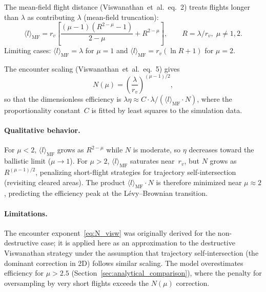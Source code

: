 The mean-field flight distance
(Viswanathan~et~al.\ eq.~2) treats flights longer than
$\lambda$ as contributing $\lambda$ (mean-field truncation):
\begin{equation}
  \langle l \rangle_{\mathrm{MF}} = r_v \left[
    \frac{(\mu-1)(R^{2-\mu}-1)}{2-\mu} + R^{2-\mu}
  \right], \qquad R = \lambda/r_v,\; \mu \neq 1,2.
  \label{eq:mean_l_mf}
\end{equation}
Limiting cases: $\langle l \rangle_{\mathrm{MF}} = \lambda$
for $\mu = 1$ and
$\langle l \rangle_{\mathrm{MF}} =
r_v(\ln R + 1)$ for $\mu = 2$.

The encounter scaling
(Viswanathan~et~al.\ eq.~5) gives
\begin{equation}
  N(\mu) = \left(\frac{\lambda}{r_v}\right)^{(\mu-1)/2},
  \label{eq:N_visw}
\end{equation}
so that the dimensionless efficiency is
$\lambda\eta \approx C \cdot
\lambda / (\langle l \rangle_{\mathrm{MF}} \cdot N)$,
where the proportionality constant~$C$ is fitted by
least squares to the simulation data.

\paragraph{Qualitative behavior.}
For $\mu < 2$,
$\langle l \rangle_{\mathrm{MF}}$ grows as
$R^{2-\mu}$ while $N$ is moderate, so $\eta$ decreases
toward the ballistic limit ($\mu \to 1$).
For $\mu > 2$,
$\langle l \rangle_{\mathrm{MF}}$ saturates near~$r_v$,
but $N$ grows as $R^{(\mu-1)/2}$, penalizing short-flight
strategies for trajectory self-intersection (revisiting
cleared areas).  The product
$\langle l \rangle_{\mathrm{MF}} \cdot N$ is therefore
minimized near $\mu \approx 2$, predicting the efficiency
peak at the L\'evy--Brownian transition.

\paragraph{Limitations.}
The encounter exponent~\eqref{eq:N_visw} was originally
derived for the non-destructive case; it is applied here
as an approximation to the destructive Viswanathan strategy
under the assumption that trajectory self-intersection
(the dominant correction in 2D) follows similar scaling.
The model overestimates efficiency for $\mu > 2.5$
(Section~\ref{sec:analytical_comparison}), where the
penalty for oversampling by very short flights exceeds the
$N(\mu)$ correction.

